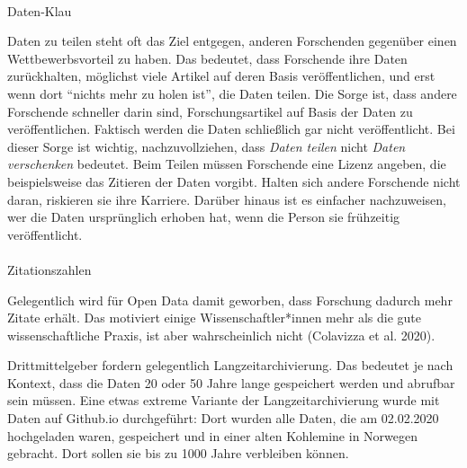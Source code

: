\documentclass[
  letterpaper,
  DIV=11,
  numbers=noendperiod]{scrreprt}
\makeatletter
\let\oldparagraph\paragraph
\renewcommand{\paragraph}{
    \@ifstar
      \xxxParagraphStar
      \xxxParagraphNoStar
  }
\newcommand{\xxxParagraphStar}[1]{\oldparagraph*{#1}\mbox{}}
\newcommand{\xxxParagraphNoStar}[1]{\oldparagraph{#1}\mbox{}}
\makeatother
\begin{document}
\paragraph{Daten-Klau}\label{daten-klau}

Daten zu teilen steht oft das Ziel entgegen, anderen Forschenden
gegenüber einen Wettbewerbsvorteil zu haben. Das bedeutet, dass
Forschende ihre Daten zurückhalten, möglichst viele Artikel auf deren
Basis veröffentlichen, und erst wenn dort ``nichts mehr zu holen ist'',
die Daten teilen. Die Sorge ist, dass andere Forschende schneller darin
sind, Forschungsartikel auf Basis der Daten zu veröffentlichen. Faktisch
werden die Daten schließlich gar nicht veröffentlicht. Bei dieser Sorge
ist wichtig, nachzuvollziehen, dass \emph{Daten teilen} nicht
\emph{Daten verschenken} bedeutet. Beim Teilen müssen Forschende eine
Lizenz angeben, die beispielsweise das Zitieren der Daten vorgibt.
Halten sich andere Forschende nicht daran, riskieren sie ihre Karriere.
Darüber hinaus ist es einfacher nachzuweisen, wer die Daten ursprünglich
erhoben hat, wenn die Person sie frühzeitig veröffentlicht.

\paragraph{Zitationszahlen}\label{zitationszahlen}

Gelegentlich wird für Open Data damit geworben, dass Forschung dadurch
mehr Zitate erhält. Das motiviert einige Wissenschaftler*innen mehr als
die gute wissenschaftliche Praxis, ist aber wahrscheinlich nicht
(Colavizza et al. 2020).

\begin{tcolorbox}[enhanced jigsaw, title=\textcolor{quarto-callout-note-color}{\faInfo}\hspace{0.5em}{Was bedeutet Langzeitarchivierung?}, colbacktitle=quarto-callout-note-color!10!white, rightrule=.15mm, titlerule=0mm, left=2mm, bottomrule=.15mm, arc=.35mm, leftrule=.75mm, toprule=.15mm, opacityback=0, breakable, bottomtitle=1mm, colframe=quarto-callout-note-color-frame, toptitle=1mm, opacitybacktitle=0.6, coltitle=black, colback=white]

Drittmittelgeber fordern gelegentlich Langzeitarchivierung. Das bedeutet
je nach Kontext, dass die Daten 20 oder 50 Jahre lange gespeichert
werden und abrufbar sein müssen. Eine etwas extreme Variante der
Langzeitarchivierung wurde mit Daten auf Github.io durchgeführt: Dort
wurden alle Daten, die am 02.02.2020 hochgeladen waren, gespeichert und
in einer alten Kohlemine in Norwegen gebracht. Dort sollen sie bis zu
1000 Jahre verbleiben können.

\end{tcolorbox}
\end{document}
